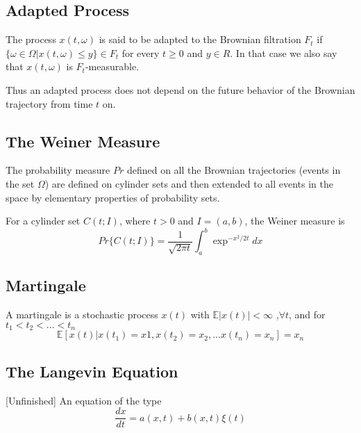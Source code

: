 \documentclass[12pt]{paper}
\begin{document}
\subsection{Adapted Process}
The process $x(t,\omega)$ is said to be adapted
to the Brownian filtration $F_t$ if $\{\omega\in\Omega|x(t,\omega) \leq y\} \in F_t$ for every $t \geq 0$ and
$y\in R$. In that case we also say that $x(t, \omega)$ is $F_t$-measurable.

Thus an adapted process does not depend on the future behavior of the Brownian trajectory from time $t$ on.

\subsection{The Weiner Measure}\label{theWeinerMeasure}
The probability measure $Pr$ defined on all the Brownian trajectories (events in the set $\Omega$) are defined on cylinder sets and then extended to all events in the space by elementary properties of probability sets.

For a cylinder set $C(t;I)$, where $t>0$ and $I=(a,b)$, the Weiner measure is 
\begin{equation*}
Pr\{C(t;I)\}=\frac{1}{\sqrt{2\pi t}}\int_a^b\exp^{-x^2/2t}dx
\end{equation*}

\subsection{Martingale}\label{martingale}
A martingale is a stochastic process $ x(t)$ with $\mathbb{E}|x(t)|<\infty$ ,$\forall t$, and for $t_1<t_2<...<t_n$
\begin{equation*}
\mathbb{E}[x(t)|x(t_1)=x1,x(t_2)=x_2,...x(t_n)=x_n]=x_n
\end{equation*}

\subsection{The Langevin Equation}{[Unfinished]}
An equation of the type 
\begin{equation*}
\frac{dx}{dt}=a(x,t)+b(x,t)\xi(t)
\end{equation*}
\end{document}
